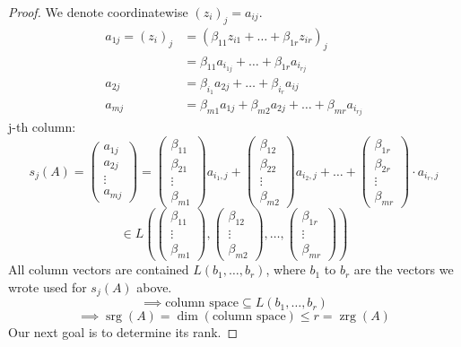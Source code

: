 \documentclass[a4paper,landscape,twocolumn]{article}
\begin{document}
\begin{proof}
  We denote coordinatewise $(z_i)_j = a_{ij}$.
  \begin{align*}
    a_{1j} = (z_i)_{j}
      &= (\beta_{11} z_{i 1} + \ldots + \beta_{1r} z_{i r})_j \\
      &= \beta_{11} a_{i_{1j}} + \ldots + \beta_{1r} a_{i_{rj}} \\
    a_{2j} &= \beta_{i_1} a_{2j} + \ldots + \beta_{i_r} a_{ij} \\
    a_{mj} &= \beta_{m1} a_{1j} + \beta_{m2} a_{2j} + \ldots + \beta_{mr} a_{i_{rj}}
  \end{align*}
  j-th column:
  \[
    s_j(A)
      = \begin{pmatrix} a_{1j} \\ a_{2j} \\ \vdots \\ a_{mj} \end{pmatrix}
      = \begin{pmatrix} \beta_{11} \\ \beta_{21} \\ \vdots \\ \beta_{m1} \end{pmatrix}
      a_{i_1,j} +
      \begin{pmatrix} \beta_{12} \\ \beta_{22} \\ \vdots \\ \beta_{m2} \end{pmatrix}
      a_{i_2,j} + \ldots +
      \begin{pmatrix} \beta_{1r} \\ \beta_{2r} \\ \vdots \\ \beta_{mr} \end{pmatrix}
      \cdot a_{i_r,j}
  \]
  \[
    \in L\left(
      \begin{pmatrix} \beta_{11} \\ \vdots \\ \beta_{m1} \end{pmatrix},
      \begin{pmatrix} \beta_{12} \\ \vdots \\ \beta_{m2} \end{pmatrix},
      \ldots,
      \begin{pmatrix} \beta_{1r} \\ \vdots \\ \beta_{mr} \end{pmatrix}
    \right)
  \]
  All column vectors are contained $L(b_1, \ldots, b_r)$, where $b_1$ to $b_r$
  are the vectors we wrote used for $s_j(A)$ above.
  \[ \implies \text{column space} \subseteq L(b_1, \ldots, b_r) \]
  \[ \implies \operatorname{srg}(A) = \dim{(\text{column space})} \leq r = \operatorname{zrg}(A) \]
  Our next goal is to determine its rank.


\end{proof}
\end{document}
